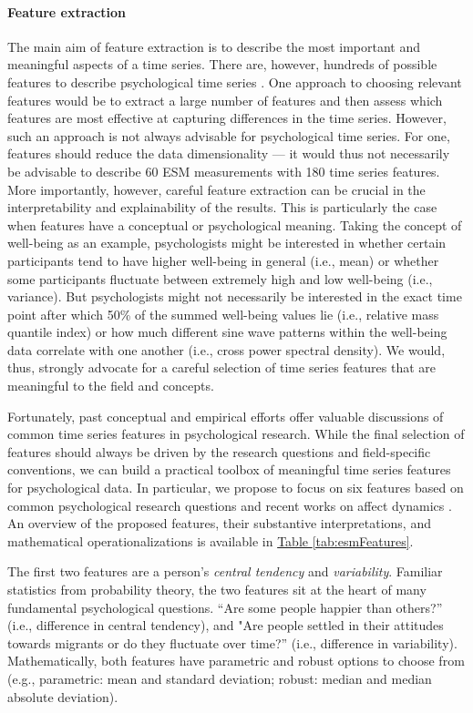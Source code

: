 \documentclass[man, 12pt, a4paper, mask]{apa7}
\theoremstyle{break}
\theoremstyle{plain}
\newcommand{\tblref}[2][]{\hyperref[#2]{Table \ref*{#2}#1}}
\begin{document}
\paragraph{Feature extraction}
The main aim of feature extraction is to describe the most important and meaningful aspects of a time series. There are, however, hundreds of possible features to describe psychological time series \citep[e.g., tsfresh][]{christ2018}. One approach to choosing relevant features would be to extract a large number of features and then assess which features are most effective at capturing differences in the time series. However, such an approach is not always advisable for psychological time series. For one, features should reduce the data dimensionality --- it would thus not necessarily be advisable to describe 60 ESM measurements with 180 time series features. More importantly, however, careful feature extraction can be crucial in the interpretability and explainability of the results. This is particularly the case when features have a conceptual or psychological meaning. Taking the concept of well-being as an example, psychologists might be interested in whether certain participants tend to have higher well-being in general (i.e., mean) or whether some participants fluctuate between extremely high and low well-being (i.e., variance). But psychologists might not necessarily be interested in the exact time point after which 50\% of the summed well-being values lie (i.e., relative mass quantile index) or how much different sine wave patterns within the well-being data correlate with one another (i.e., cross power spectral density). We would, thus, strongly advocate for a careful selection of time series features that are meaningful to the field and concepts.

Fortunately, past conceptual and empirical efforts offer valuable discussions of common time series features in psychological research. While the final selection of features should always be driven by the research questions and field-specific conventions, we can build a practical toolbox of meaningful time series features for psychological data. In particular, we propose to focus on six features based on common psychological research questions and recent works on affect dynamics \citep[e.g.,][]{dejonckheere2019, kuppens2017, adya2001}. An overview of the proposed features, their substantive interpretations, and mathematical operationalizations is available in \tblref{tab:esmFeatures}.

The first two features are a person's \textit{central tendency} and \textit{variability}. Familiar statistics from probability theory, the two features sit at the heart of many fundamental psychological questions. ``Are some people happier than others?'' (i.e., difference in central tendency), and "Are people settled in their attitudes towards migrants or do they fluctuate over time?'' (i.e., difference in variability). Mathematically, both features have parametric and robust options to choose from (e.g., parametric: mean and standard deviation; robust: median and median absolute deviation). 
\end{document}
